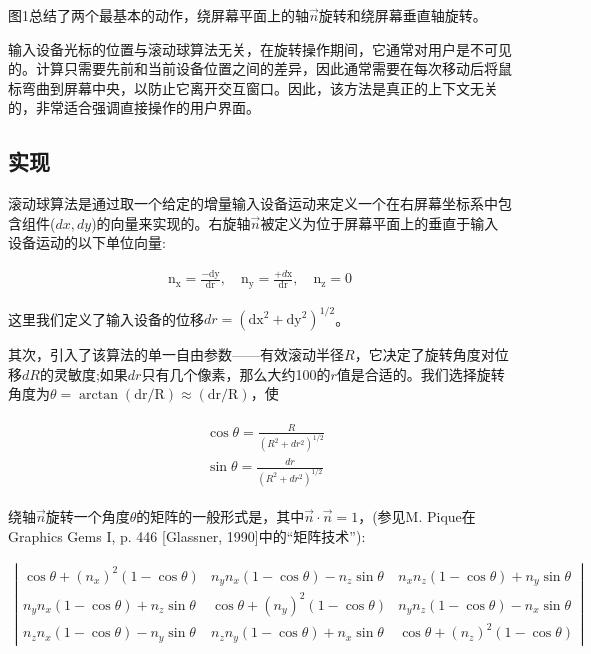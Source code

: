 \begin{CJK}{UTF8}{gbsn}
图1总结了两个最基本的动作，绕屏幕平面上的轴$\vec{n}$旋转和绕屏幕垂直轴旋转。


输入设备光标的位置与滚动球算法无关，在旋转操作期间，它通常对用户是不可见的。计算只需要先前和当前设备位置之间的差异，因此通常需要在每次移动后将鼠标弯曲到屏幕中央，以防止它离开交互窗口。因此，该方法是真正的上下文无关的，非常适合强调直接操作的用户界面。

\subsection*{实现}
滚动球算法是通过取一个给定的增量输入设备运动来定义一个在右屏幕坐标系中包含组件($dx, dy$)的向量来实现的。右旋轴$\vec{n}$被定义为位于屏幕平面上的垂直于输入设备运动的以下单位向量:


\begin{align}
\mathrm{n}_{\mathrm{x}}=\frac{-\mathrm{dy}}{\mathrm{dr}}, \quad \mathrm{n}_{\mathrm{y}}=\frac{+d \mathrm{x}}{\mathrm{dr}}, \quad \mathrm{n}_{\mathrm{z}}=0
\end{align}

这里我们定义了输入设备的位移$d r=\left(\mathrm{dx}^{2}+\mathrm{dy}^{2}\right)^{1 / 2}$。

其次，引入了该算法的单一自由参数——有效滚动半径$R$，它决定了旋转角度对位移$d R$的灵敏度;如果$d r$只有几个像素，那么大约100的$ r$值是合适的。我们选择旋转角度为$\theta=\arctan (\mathrm{dr} / \mathrm{R}) \approx(\mathrm{dr} / \mathrm{R})$，使

\begin{align}
\begin{aligned}
&\cos \theta=\frac{R}{\left(R^{2}+d r^{2}\right)^{1 / 2}} \\
&\sin \theta=\frac{d r}{\left(R^{2}+d r^{2}\right)^{1 / 2}}
\end{aligned}
\end{align}

绕轴$\vec{n}$旋转一个角度$\theta$的矩阵的一般形式是，其中$\vec{n} \cdot \vec{n}=1$，(参见M. Pique在Graphics Gems I, p. 446 [Glassner, 1990]中的“矩阵技术”):

\begin{align}
\left|\begin{array}{ccc}
\cos \theta+\left(n_{x}\right)^{2}(1-\cos \theta) & n_{y} n_{x}(1-\cos \theta)-n_{z} \sin \theta & n_{x} n_{z}(1-\cos \theta)+n_{y} \sin \theta \\
n_{y} n_{x}(1-\cos \theta)+n_{z} \sin \theta & \cos \theta+\left(n_{y}\right)^{2}(1-\cos \theta) & n_{y} n_{z}(1-\cos \theta)-n_{x} \sin \theta \\
n_{z} n_{x}(1-\cos \theta)-n_{y} \sin \theta & n_{z} n_{y}(1-\cos \theta)+n_{x} \sin \theta & \cos \theta+\left(n_{z}\right)^{2}(1-\cos \theta)
\end{array}\right|
\end{align}



\end{CJK}
